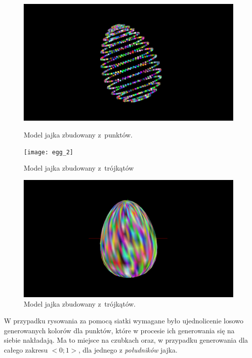 \begin{figure}[H]
    \
    \begin{minipage}[t]{.45\linewidth}
        \includegraphics[width=\linewidth, trim={8cm 0 8cm 0},clip]{img/egg_1.png}
        \caption{Model jajka zbudowany z~punktów.}
    \end{minipage}
    \hspace{.05\linewidth}
    \begin{minipage}[t]{0.45\linewidth}
        \texttt{[image: egg\_2]}
        \caption{Model jajka zbudowany z~trójkątów}
    \end{minipage}
\end{figure}
\begin{figure}[h]
    \centering
    \includegraphics[width=0.45\linewidth, trim={8cm 0 8cm 0},clip]{img/egg_3.png}
    \caption{Model jajka zbudowany z~trójkątów.}
\end{figure}
W przypadku rysowania za pomocą siatki wymagane było ujednolicenie losowo generowanych kolorów dla punktów, które w procesie ich generowania się na siebie nakładają. Ma to miejsce na czubkach oraz, w przypadku generowania dla całego zakresu $<0;1>$, dla jednego z \textit{południków} jajka.

